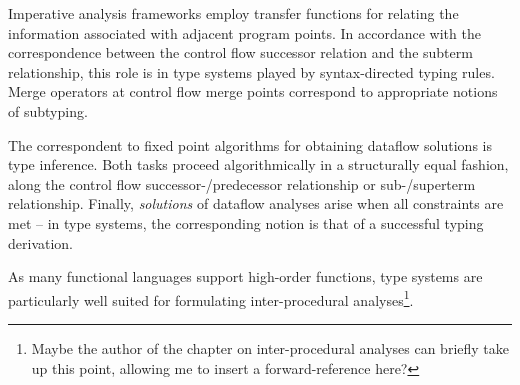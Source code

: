 {Imperative analysis frameworks employ transfer functions for relating
the information associated with adjacent program points. In accordance
with the correspondence between the control flow successor relation and
the subterm relationship, this role is in type systems played by
syntax-directed typing rules. Merge operators at control flow merge
points correspond to appropriate notions of subtyping.

The correspondent to fixed point algorithms for obtaining dataflow
solutions is type inference. Both tasks proceed algorithmically in a
structurally equal fashion, along the control flow
successor-/predecessor relationship or sub-/superterm relationship.
Finally, \emph{solutions} of dataflow analyses arise when
all constraints are met -- in type systems, the corresponding notion is
that of a successful typing derivation.

As many functional languages support high-order functions, type
systems are particularly well suited for formulating inter-procedural
analyses\footnote{Maybe the author of the chapter on inter-procedural
analyses can briefly take up this point, allowing me to insert a
forward-reference here?}.

}
